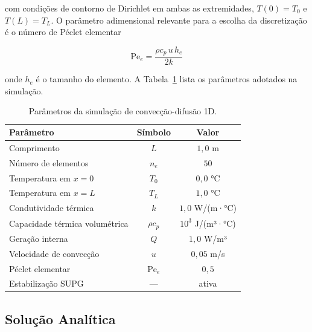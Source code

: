 \noindent com condições de contorno de Dirichlet em ambas as extremidades, $T(0) = T_0$ e $T(L) = T_L$. O parâmetro adimensional relevante para a escolha da discretização é o número de Péclet elementar

\begin{equation}
    \mathrm{Pe}_e = \frac{\rho c_p \, u \, h_e}{2 k}
    \label{eq:val_convdif_pe}
\end{equation}

\noindent onde $h_e$ é o tamanho do elemento. A Tabela~\ref{tab:val_convdif_params} lista os parâmetros adotados na simulação.

\begin{table}[htbp]
    \centering
    \caption{Parâmetros da simulação de convecção-difusão 1D.}
    \label{tab:val_convdif_params}
    \begin{tabular}{lcc}
        \hline
        \textbf{Parâmetro} & \textbf{Símbolo} & \textbf{Valor} \\
        \hline
        Comprimento                         & $L$          & $1{,}0$ m          \\
        Número de elementos                 & $n_e$        & $50$               \\
        Temperatura em $x = 0$              & $T_0$        & $0{,}0$ °C         \\
        Temperatura em $x = L$              & $T_L$        & $1{,}0$ °C         \\
        Condutividade térmica               & $k$          & $1{,}0$ W/(m·°C)   \\
        Capacidade térmica volumétrica      & $\rho c_p$   & $10^{3}$ J/(m³·°C) \\
        Geração interna                     & $Q$          & $1{,}0$ W/m³       \\
        Velocidade de convecção             & $u$          & $0{,}05$ m/s       \\
        Péclet elementar                    & $\mathrm{Pe}_e$ & $0{,}5$         \\
        Estabilização SUPG                  & ---          & ativa              \\
        \hline
    \end{tabular}
\end{table}

\subsection{Solução Analítica}

